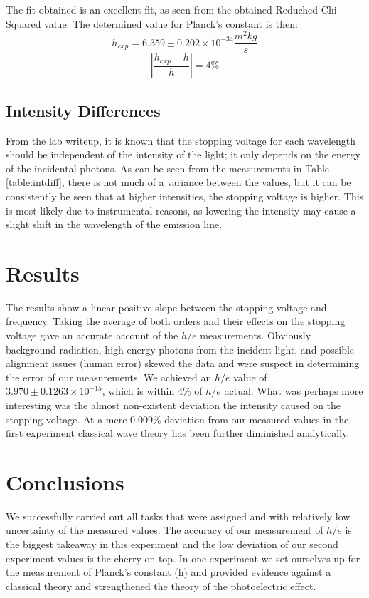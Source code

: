 \documentclass[a4paper, twocolumn]{article}
\begin{document}
The fit obtained is an excellent fit, as seen from the obtained Reduched Chi-Squared value. The determined value for
Planck's constant is then:
\begin{equation*}
h_{exp} = 6.359 \pm 0.202 \times 10^{-34} \text{$\frac{m^2 kg}{s}$}
\end{equation*}
\begin{equation*}
 \left|\frac{h_{exp}-h}{h}\right| = 4\%
\end{equation*}
\vfill\eject
\subsection{Intensity Differences}
From the lab writeup, it is known that the stopping voltage for each wavelength should be independent of the intensity of the light; it only
depends on the energy of the incidental photons. As can be seen from the measurements in Table \ref{table:intdiff}, there is not much
of a variance between the values, but it can be consistently be seen that at higher intensities, the stopping voltage is higher. This
is most likely due to instrumental reasons, as lowering the intensity may cause a slight shift in the wavelength of the emission line.

\section{Results}
The results show a linear positive slope between the stopping voltage and frequency. Taking the average
of both orders and their effects on the stopping voltage gave an accurate account of the $h/e$ measurements.
Obviously background radiation, high energy photons from the incident light, and possible alignment
issues (human error) skewed the data and were suspect in determining the error of our measurements. We
achieved an $h/e$ value of $3.970 \pm 0.1263 \times 10^{-15}$, which is within 4\% of $h/e$ actual. What was perhaps
more interesting was the almost non-existent deviation the intensity caused on the stopping voltage. At a
mere 0.009\% deviation from our measured values in the first experiment classical wave theory has been
further diminished analytically.

\section{Conclusions}
We successfully carried out all tasks that were assigned and with relatively low uncertainty of the
measured values. The accuracy of our measurement of $h/e$ is the biggest takeaway in this experiment and
the low deviation of our second experiment values is the cherry on top. In one experiment we set
ourselves up for the measurement of Planck’s constant (h) and provided evidence against a classical
theory and strengthened the theory of the photoelectric effect.
\end{document}
